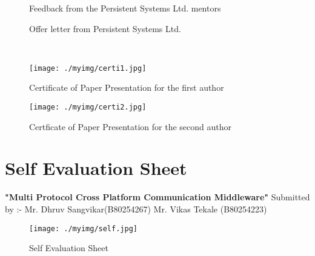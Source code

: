 \documentclass{SureshLimkar}
\begin{document}
%


\begin{figure}[h]%
\centering
{}%
\caption{Feedback from the Persistent Systems Ltd. mentors}%
\label{feedback}%
\end{figure}
\newpage

\begin{figure}[h]%
\centering
{}%
\caption{Offer letter from Persistent Systems Ltd.}%
\label{offer}%
\end{figure}
\newpage

\\

\begin{figure}%
\texttt{[image: ./myimg/certi1.jpg]}%
\caption{Certificate of Paper Presentation for the first author}%
\label{}%
\end{figure}
\newpage
\begin{figure}%
\texttt{[image: ./myimg/certi2.jpg]}%
\caption{Certficate of Paper Presentation for the second author}%
\label{}%
\end{figure}
\newpage


\chapter{Self Evaluation Sheet}

\textbf{"Multi Protocol Cross Platform Communication Middleware"}
\newline
Submitted by :-
\newline Mr. Dhruv Sangvikar(B80254267)
\newline Mr. Vikas Tekale (B80254223)

\begin{figure}[h]%
\centering
\texttt{[image: ./myimg/self.jpg]}%
\caption{Self Evaluation Sheet}%
\label{offer}%
\end{figure}
\newpage
\end{document}
